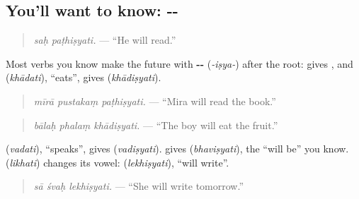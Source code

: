 \subsection*{You'll want to know: --}
\begin{quote}
\textbf{ }
\end{quote}

\begin{quote}
\emph{saḥ paṭhiṣyati.} — \textquotedblleft{}He will read.\textquotedblright{}
\end{quote}

Most verbs you know make the future with \textbf{--} (\emph{-iṣya-}) after the root: \textbf{} gives \textbf{}, and \textbf{} (\emph{khādati}), \textquotedblleft{}eats\textquotedblright{}, gives \textbf{} (\emph{khādiṣyati}).

\begin{quote}
\textbf{  }
\end{quote}

\begin{quote}
\emph{mīrā pustakaṃ paṭhiṣyati.} — \textquotedblleft{}Mira will read the book.\textquotedblright{}
\end{quote}

\begin{quote}
\textbf{  }
\end{quote}

\begin{quote}
\emph{bālaḥ phalaṃ khādiṣyati.} — \textquotedblleft{}The boy will eat the fruit.\textquotedblright{}
\end{quote}

\textbf{} (\emph{vadati}), \textquotedblleft{}speaks\textquotedblright{}, gives \textbf{} (\emph{vadiṣyati}). \textbf{} gives \textbf{} (\emph{bhaviṣyati}), the \textquotedblleft{}will be\textquotedblright{} you know. \textbf{} (\emph{likhati}) changes its vowel: \textbf{} (\emph{lekhiṣyati}), \textquotedblleft{}will write\textquotedblright{}.

\begin{quote}
\textbf{  }
\end{quote}

\begin{quote}
\emph{sā śvaḥ lekhiṣyati.} — \textquotedblleft{}She will write tomorrow.\textquotedblright{}
\end{quote}

